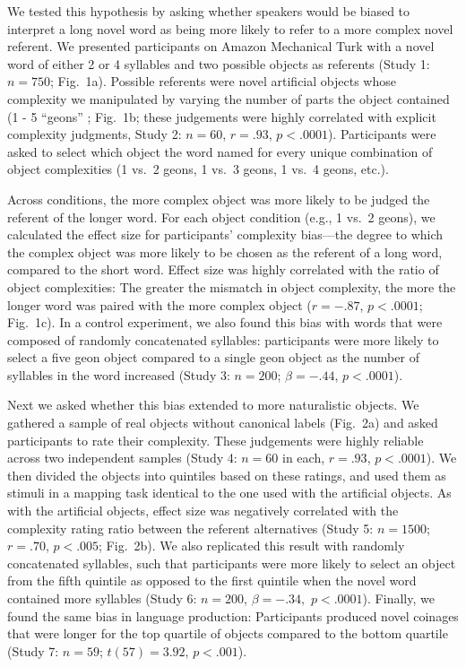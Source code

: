 \documentclass[12pt]{article}
\begin{document}
We tested this hypothesis by asking whether speakers would be biased to interpret a long novel word as being more likely to refer to a more complex novel referent. We presented participants on Amazon Mechanical Turk with a novel word of either 2 or 4 syllables and two possible objects as referents (Study 1: $n = 750$; Fig.\ 1a). Possible referents were novel artificial objects whose complexity we manipulated by varying the number of parts the object contained (1 - 5 ``geons'' \cite{biederman1987}; Fig.\ 1b; these judgements were highly correlated with explicit complexity judgments, Study 2: $n = 60$, $r = .93$, $p < .0001$). Participants were asked to select which object the word named for every unique combination of object complexities (1 vs.\ 2 geons, 1 vs.\ 3 geons, 1 vs.\ 4 geons, etc.).

Across conditions, the more complex object was more likely to be judged the referent of the longer word. For each object condition (e.g., 1 vs.\ 2 geons), we calculated the effect size for participants' complexity bias---the degree to which the complex object was more likely to be chosen as the referent of a long word, compared to the short word. Effect size was highly correlated with the ratio of object complexities: The greater the mismatch in object complexity, the more the longer word was paired with the more complex object ($r = -.87$, $p < .0001$; Fig.\ 1c). In a control experiment, we also found this bias with words that were composed of randomly concatenated syllables: participants were more likely to select a five geon object compared to a single geon object as the number of syllables in the word increased (Study 3: $n = 200$; $\beta=-.44$, $p <.0001$).
					

Next we asked whether this bias extended to more naturalistic objects. We gathered a sample of real objects without canonical labels (Fig.\ 2a) and asked participants to rate their complexity. These judgements were highly reliable across two independent samples (Study 4: $n = 60$ in each, $r = .93$, $p < .0001$). We then divided the objects into quintiles based on these ratings, and used them as stimuli in a mapping task identical to the one used with the artificial objects. As with the artificial objects, effect size was negatively correlated with the complexity rating ratio between the referent alternatives (Study 5: $n = 1500$; $r = .70$, $p < .005$; Fig.\ 2b). We also replicated this result with randomly concatenated syllables, such that participants were more likely to select an object from the fifth quintile as opposed to the first quintile when the novel word contained more syllables (Study 6: $n=200$, $\beta=-.34,$ $p <.0001$). Finally, we  found the same bias in language production: Participants produced novel coinages that were longer for the top quartile of objects compared to the bottom quartile (Study 7: $n = 59$; $t(57) = 3.92$, $p < .001$). 
\end{document}
